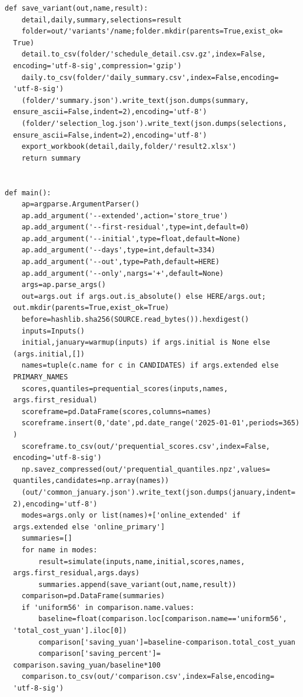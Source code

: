 \begin{verbatim}
def save_variant(out,name,result):
    detail,daily,summary,selections=result
    folder=out/'variants'/name;folder.mkdir(parents=True,exist_ok=
  True)
    detail.to_csv(folder/'schedule_detail.csv.gz',index=False,
  encoding='utf-8-sig',compression='gzip')
    daily.to_csv(folder/'daily_summary.csv',index=False,encoding=
  'utf-8-sig')
    (folder/'summary.json').write_text(json.dumps(summary,
  ensure_ascii=False,indent=2),encoding='utf-8')
    (folder/'selection_log.json').write_text(json.dumps(selections,
  ensure_ascii=False,indent=2),encoding='utf-8')
    export_workbook(detail,daily,folder/'result2.xlsx')
    return summary


def main():
    ap=argparse.ArgumentParser()
    ap.add_argument('--extended',action='store_true')
    ap.add_argument('--first-residual',type=int,default=0)
    ap.add_argument('--initial',type=float,default=None)
    ap.add_argument('--days',type=int,default=334)
    ap.add_argument('--out',type=Path,default=HERE)
    ap.add_argument('--only',nargs='+',default=None)
    args=ap.parse_args()
    out=args.out if args.out.is_absolute() else HERE/args.out;
  out.mkdir(parents=True,exist_ok=True)
    before=hashlib.sha256(SOURCE.read_bytes()).hexdigest()
    inputs=Inputs()
    initial,january=warmup(inputs) if args.initial is None else
  (args.initial,[])
    names=tuple(c.name for c in CANDIDATES) if args.extended else
  PRIMARY_NAMES
    scores,quantiles=prequential_scores(inputs,names,
  args.first_residual)
    scoreframe=pd.DataFrame(scores,columns=names)
    scoreframe.insert(0,'date',pd.date_range('2025-01-01',periods=365)
  )
    scoreframe.to_csv(out/'prequential_scores.csv',index=False,
  encoding='utf-8-sig')
    np.savez_compressed(out/'prequential_quantiles.npz',values=
  quantiles,candidates=np.array(names))
    (out/'common_january.json').write_text(json.dumps(january,indent=
  2),encoding='utf-8')
    modes=args.only or list(names)+['online_extended' if
  args.extended else 'online_primary']
    summaries=[]
    for name in modes:
        result=simulate(inputs,name,initial,scores,names,
  args.first_residual,args.days)
        summaries.append(save_variant(out,name,result))
    comparison=pd.DataFrame(summaries)
    if 'uniform56' in comparison.name.values:
        baseline=float(comparison.loc[comparison.name=='uniform56',
  'total_cost_yuan'].iloc[0])
        comparison['saving_yuan']=baseline-comparison.total_cost_yuan
        comparison['saving_percent']=
  comparison.saving_yuan/baseline*100
    comparison.to_csv(out/'comparison.csv',index=False,encoding=
  'utf-8-sig')

\end{verbatim}
